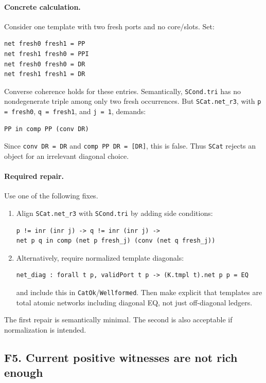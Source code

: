 \documentclass[11pt]{article}
\begin{document}
\paragraph{Concrete calculation.}
Consider one template with two fresh ports and no core/slots.  Set:
\begin{lstlisting}
net fresh0 fresh1 = PP
net fresh1 fresh0 = PPI
net fresh0 fresh0 = DR
net fresh1 fresh1 = DR
\end{lstlisting}
Converse coherence holds for these entries.  Semantically, \texttt{SCond.tri}
has no nondegenerate triple among only two fresh occurrences.  But
\texttt{SCat.net\_r3}, with \texttt{p = fresh0}, \texttt{q = fresh1}, and
\texttt{j = 1}, demands:
\begin{lstlisting}
PP in comp PP (conv DR)
\end{lstlisting}
Since \texttt{conv DR = DR} and \texttt{comp PP DR = [DR]}, this is false.
Thus \texttt{SCat} rejects an object for an irrelevant diagonal choice.

\paragraph{Required repair.}
Use one of the following fixes.
\begin{enumerate}
  \item Align \texttt{SCat.net\_r3} with \texttt{SCond.tri} by adding side
        conditions:
\begin{lstlisting}
p != inr (inr j) -> q != inr (inr j) ->
net p q in comp (net p fresh_j) (conv (net q fresh_j))
\end{lstlisting}
  \item Alternatively, require normalized template diagonals:
\begin{lstlisting}
net_diag : forall t p, validPort t p -> (K.tmpl t).net p p = EQ
\end{lstlisting}
        and include this in \texttt{CatOk}/\texttt{Wellformed}.  Then make
        explicit that templates are total atomic networks including diagonal
        EQ, not just off-diagonal ledgers.
\end{enumerate}
The first repair is semantically minimal.  The second is also acceptable if
normalization is intended.

\subsection{F5. Current positive witnesses are not rich enough}
\end{document}
